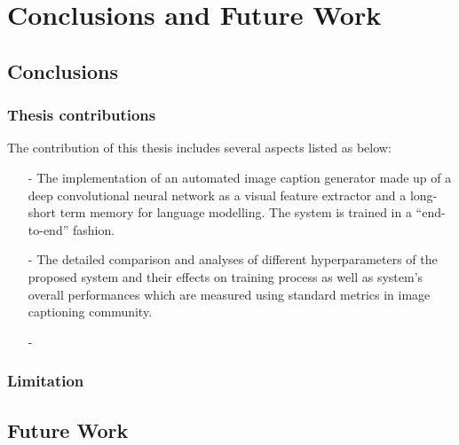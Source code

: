 \chapter{Conclusions and Future Work}

\section{Conclusions}
	\subsection{Thesis contributions}
		The contribution of this thesis includes several aspects listed as below:
		\begin{itemize}
			\item[-] The implementation of an automated image caption generator made up of a deep convolutional neural network as a visual feature extractor and a long-short term memory for language modelling. The system is trained in a ``end-to-end'' fashion.
			\item[-] The detailed comparison and analyses of different hyperparameters of the proposed system and their effects on training process as well as system's overall performances which are measured using standard metrics in image captioning community.
			\item[-]
		\end{itemize}
	\subsection{Limitation}
		\lipsum[3]
\section{Future Work}